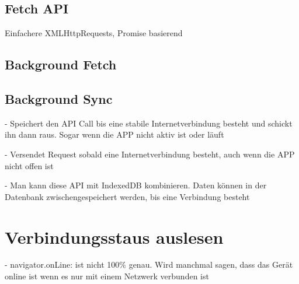 \subsection{Fetch API}

Einfachere XMLHttpRequests, Promise basierend
\autocite{Rojas2020}

\subsection{Background Fetch}

\subsection{Background Sync}

- Speichert den API Call bis eine stabile Internetverbindung besteht und schickt ihn dann raus. Sogar wenn die APP nicht aktiv ist oder läuft \autocite{Sheppard2017}

- Versendet Request sobald eine Internetverbindung besteht, auch wenn die APP nicht offen ist \autocite{Rojas2020}

- Man kann diese API mit IndexedDB kombinieren. Daten können in der Datenbank zwischengespeichert werden, bis eine Verbindung besteht \autocite{Rojas2020}

\section{Verbindungsstaus auslesen}

- navigator.onLine: ist nicht 100\% genau. Wird manchmal sagen, dass das Gerät online ist wenn es nur mit einem Netzwerk verbunden ist \autocite{Sheppard2017}


